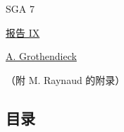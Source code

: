 
\begin{center}
SGA 7

\vspace{1em}
\underline{报告 IX}

\vspace{1em}

\vspace{1em}
\underline{A. Grothendieck}

（附 M. Raynaud 的附录）
\end{center}

\subsection*{目录}

